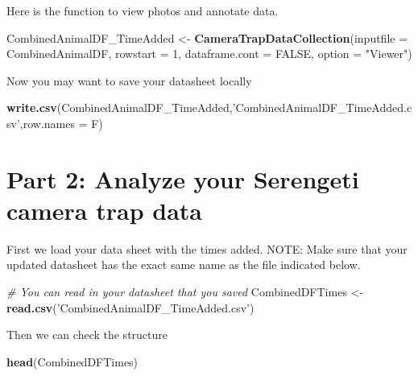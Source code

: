 \documentclass[]{book}
\newenvironment{Shaded}{\begin{snugshade}}{\end{snugshade}}
\newcommand{\CommentTok}[1]{\textcolor[rgb]{0.56,0.35,0.01}{\textit{#1}}}
\newcommand{\DataTypeTok}[1]{\textcolor[rgb]{0.13,0.29,0.53}{#1}}
\newcommand{\DecValTok}[1]{\textcolor[rgb]{0.00,0.00,0.81}{#1}}
\newcommand{\KeywordTok}[1]{\textcolor[rgb]{0.13,0.29,0.53}{\textbf{#1}}}
\newcommand{\NormalTok}[1]{#1}
\newcommand{\OtherTok}[1]{\textcolor[rgb]{0.56,0.35,0.01}{#1}}
\newcommand{\StringTok}[1]{\textcolor[rgb]{0.31,0.60,0.02}{#1}}
\begin{document}
Here is the function to view photos and annotate data.

\begin{Shaded}
\begin{Highlighting}[]
\NormalTok{CombinedAnimalDF_TimeAdded <-}\StringTok{ }\KeywordTok{CameraTrapDataCollection}\NormalTok{(}\DataTypeTok{inputfile =}\NormalTok{ CombinedAnimalDF, }
                                                       \DataTypeTok{rowstart =} \DecValTok{1}\NormalTok{, }\DataTypeTok{dataframe.cont =} \OtherTok{FALSE}\NormalTok{, }\DataTypeTok{option =} \StringTok{"Viewer"}\NormalTok{)}
\end{Highlighting}
\end{Shaded}

Now you may want to save your datasheet locally

\begin{Shaded}
\begin{Highlighting}[]
\KeywordTok{write.csv}\NormalTok{(CombinedAnimalDF_TimeAdded,}\StringTok{'CombinedAnimalDF_TimeAdded.csv'}\NormalTok{,}\DataTypeTok{row.names =}\NormalTok{ F)}
\end{Highlighting}
\end{Shaded}

\hypertarget{part-2-analyze-your-serengeti-camera-trap-data}{%
\section*{Part 2: Analyze your Serengeti camera trap data}\label{part-2-analyze-your-serengeti-camera-trap-data}}

First we load your data sheet with the times added.
NOTE: Make sure that your updated datasheet has the exact same name as the file indicated below.

\begin{Shaded}
\begin{Highlighting}[]
\CommentTok{# You can read in your datasheet that you saved}
\NormalTok{CombinedDFTimes <-}\StringTok{ }\KeywordTok{read.csv}\NormalTok{(}\StringTok{'CombinedAnimalDF_TimeAdded.csv'}\NormalTok{)}
\end{Highlighting}
\end{Shaded}

Then we can check the structure

\begin{Shaded}
\begin{Highlighting}[]
\KeywordTok{head}\NormalTok{(CombinedDFTimes)}
\end{Highlighting}
\end{Shaded}
\end{document}
